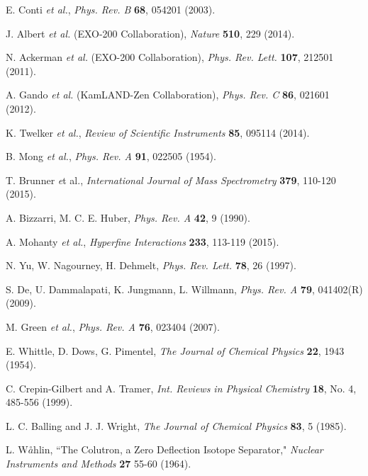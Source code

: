 \documentclass[PhD, copyrightpage]{csuthesis} %
\begin{document}
\begin{thebibliography}{00}
  E. Conti \emph{et al.}, \emph{Phys. Rev. B} \textbf{68}, 054201 (2003).
 
  J. Albert \emph{et al.} (EXO-200 Collaboration), \emph{Nature} \textbf{510}, 229 (2014).
 
  N. Ackerman \emph{et al.} (EXO-200 Collaboration), \emph{Phys. Rev. Lett.} \textbf{107}, 212501 (2011).
 
  A. Gando \emph{et al.} (KamLAND-Zen Collaboration), \emph{Phys. Rev. C} \textbf{86}, 021601 (2012).
 
  K. Twelker \emph{et al.}, \emph{Review of Scientific Instruments} \textbf{85}, 095114 (2014).
 
  B. Mong \emph{et al.}, \emph{Phys. Rev. A} \textbf{91}, 022505 (1954).
 
  T. Brunner \emph et al., \emph{International Journal of Mass Spectrometry} \textbf{379}, 110-120 (2015).
 
 
  A. Bizzarri, M. C. E. Huber, \emph{Phys. Rev. A} \textbf{42}, 9 (1990).
 
  A. Mohanty \emph{et al.}, \emph{Hyperfine Interactions} \textbf{233}, 113-119 (2015).
 
  N. Yu, W. Nagourney, H. Dehmelt, \emph{Phys. Rev. Lett.} \textbf{78}, 26 (1997).
 
  S. De, U. Dammalapati, K. Jungmann, L. Willmann, \emph{Phys. Rev. A} \textbf{79}, 041402(R) (2009).
 
  M. Green \emph{et al.}, \emph{Phys. Rev. A} \textbf{76}, 023404 (2007).
 
  E. Whittle, D. Dows, G. Pimentel, \emph{The Journal of Chemical Physics} \textbf{22}, 1943 (1954).
 
  C. Crepin-Gilbert and A. Tramer, \emph{Int. Reviews in Physical Chemistry} \textbf{18}, No. 4, 485-556 (1999).
 
  L. C. Balling and J. J. Wright, \emph{The Journal of Chemical Physics} \textbf{83}, 5 (1985).
 
  L. W$\overset{\circ}{a}$hlin, ``The Colutron, a Zero Deflection Isotope Separator," \emph{Nuclear Instruments and Methods} \textbf{27} 55-60 (1964).
 
 

\end{thebibliography}
\end{document}
